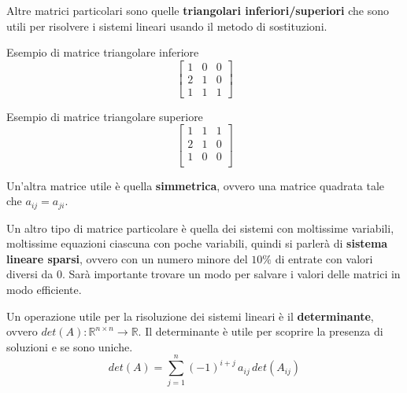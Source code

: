 Altre matrici particolari sono quelle \textbf{triangolari inferiori/superiori}
che sono utili per risolvere i sistemi lineari usando il metodo di sostituzioni.
\begin{esempio}
    Esempio di matrice triangolare inferiore
    \begin{equation*}
        \left[\begin{array}{ccc}
                1 & 0 & 0 \\
                2 & 1 & 0 \\
                1 & 1 & 1
            \end{array}\right]
    \end{equation*}
\end{esempio}
\begin{esempio}
    Esempio di matrice triangolare superiore
    \begin{equation*}
        \left[\begin{array}{ccc}
                1 & 1 & 1 \\
                2 & 1 & 0 \\
                1 & 0 & 0 \\
            \end{array}\right]
    \end{equation*}
\end{esempio}

Un'altra matrice utile è quella \textbf{simmetrica}, ovvero una matrice quadrata
tale che $a_{ij} = a_{ji}$.

Un altro tipo di matrice particolare è quella dei sistemi con moltissime variabili,
moltissime equazioni ciascuna con poche variabili, quindi si parlerà di
\textbf{sistema lineare sparsi}, ovvero con un numero minore del $10\%$ di
entrate con valori diversi da $0$. Sarà importante trovare un modo per salvare i
valori delle matrici in modo efficiente.

Un operazione utile per la risoluzione dei sistemi lineari è il \textbf{determinante},
ovvero $det(A): \mathbb{R}^{n\times n} \rightarrow \mathbb{R}$. Il determinante
è utile per scoprire la presenza di soluzioni e se sono uniche.
\begin{equation}
    det(A) = \sum_{j = 1}^{n}(-1)^{i+j} \, a_{ij} \, det(A_{ij})
\end{equation}